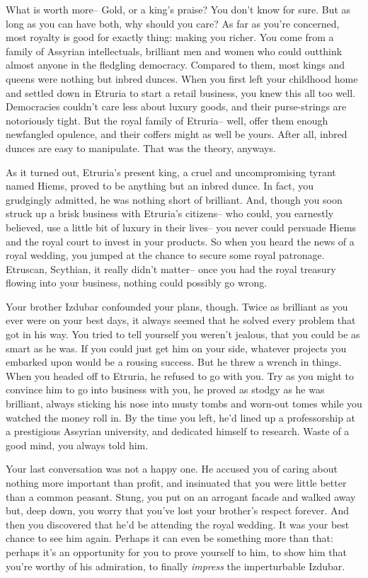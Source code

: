\documentclass[char]{Kos}
\begin{document}
\name{\cMerchant{}}

What is worth more-- Gold, or a king's praise? You don't know for sure. But as long as you can have both, why should you care? As far as you're concerned, most royalty is good for exactly thing: making you richer. You come from a family of Assyrian intellectuals, brilliant men and women who could outthink almost anyone in the fledgling democracy. Compared to them, most kings and queens were nothing but inbred dunces. When you first left your childhood home and settled down in Etruria to start a retail business, you knew this all too well. Democracies couldn't care less about luxury goods, and their purse-strings are notoriously tight. But the royal family of Etruria-- well, offer them enough newfangled opulence, and their coffers might as well be yours. After all, inbred dunces are easy to manipulate. That was the theory, anyways. 

As it turned out, Etruria's present king, a cruel and uncompromising tyrant named Hiems, proved to be anything but an inbred dunce. In fact, you grudgingly admitted, he was nothing short of brilliant. And, though you soon struck up a brisk business with Etruria's citizens-- who could, you earnestly believed, use a little bit of luxury in their lives-- you never could persuade Hiems and the royal court to invest in your products. So when you heard the news of a royal wedding, you jumped at the chance to secure some royal patronage. Etruscan, Scythian, it really didn't matter-- once you had the royal treasury flowing into your business, nothing could possibly go wrong.

Your brother Izdubar confounded your plans, though. Twice as brilliant as you ever were on your best days, it always seemed that he solved every problem that got in his way. You tried to tell yourself you weren't jealous, that you could be as smart as he was. If you could just get him on your side, whatever projects you embarked upon would be a rousing success. But he threw a wrench in things. When you headed off to Etruria, he refused to go with you. Try as you might to convince him to go into business with you, he proved as stodgy as he was brilliant, always sticking his nose into musty tombs and worn-out tomes while you watched the money roll in. By the time you left, he'd lined up a professorship at a prestigious Assyrian university, and dedicated himself to research. Waste of a good mind, you always told him.

Your last conversation was not a happy one. He accused you of caring about nothing more important than profit, and insinuated that you were little better than a common peasant. Stung, you put on an arrogant facade and walked away but, deep down, you worry that you've lost your brother's respect forever. And then you discovered that he'd be attending the royal wedding. It was your best chance to see him again. Perhaps it can even be something more than that: perhaps it's an opportunity for you to prove yourself to him, to show him that you're worthy of his admiration, to finally \textit{impress} the imperturbable Izdubar.
\end{document}

